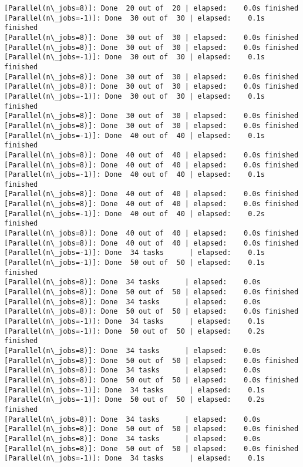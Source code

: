 \documentclass[11pt]{article}
\begin{document}
\begin{Verbatim}[commandchars=\\\{\}]
[Parallel(n\_jobs=8)]: Done  20 out of  20 | elapsed:    0.0s finished
[Parallel(n\_jobs=-1)]: Done  30 out of  30 | elapsed:    0.1s finished
[Parallel(n\_jobs=8)]: Done  30 out of  30 | elapsed:    0.0s finished
[Parallel(n\_jobs=8)]: Done  30 out of  30 | elapsed:    0.0s finished
[Parallel(n\_jobs=-1)]: Done  30 out of  30 | elapsed:    0.1s finished
[Parallel(n\_jobs=8)]: Done  30 out of  30 | elapsed:    0.0s finished
[Parallel(n\_jobs=8)]: Done  30 out of  30 | elapsed:    0.0s finished
[Parallel(n\_jobs=-1)]: Done  30 out of  30 | elapsed:    0.1s finished
[Parallel(n\_jobs=8)]: Done  30 out of  30 | elapsed:    0.0s finished
[Parallel(n\_jobs=8)]: Done  30 out of  30 | elapsed:    0.0s finished
[Parallel(n\_jobs=-1)]: Done  40 out of  40 | elapsed:    0.1s finished
[Parallel(n\_jobs=8)]: Done  40 out of  40 | elapsed:    0.0s finished
[Parallel(n\_jobs=8)]: Done  40 out of  40 | elapsed:    0.0s finished
[Parallel(n\_jobs=-1)]: Done  40 out of  40 | elapsed:    0.1s finished
[Parallel(n\_jobs=8)]: Done  40 out of  40 | elapsed:    0.0s finished
[Parallel(n\_jobs=8)]: Done  40 out of  40 | elapsed:    0.0s finished
[Parallel(n\_jobs=-1)]: Done  40 out of  40 | elapsed:    0.2s finished
[Parallel(n\_jobs=8)]: Done  40 out of  40 | elapsed:    0.0s finished
[Parallel(n\_jobs=8)]: Done  40 out of  40 | elapsed:    0.0s finished
[Parallel(n\_jobs=-1)]: Done  34 tasks      | elapsed:    0.1s
[Parallel(n\_jobs=-1)]: Done  50 out of  50 | elapsed:    0.1s finished
[Parallel(n\_jobs=8)]: Done  34 tasks      | elapsed:    0.0s
[Parallel(n\_jobs=8)]: Done  50 out of  50 | elapsed:    0.0s finished
[Parallel(n\_jobs=8)]: Done  34 tasks      | elapsed:    0.0s
[Parallel(n\_jobs=8)]: Done  50 out of  50 | elapsed:    0.0s finished
[Parallel(n\_jobs=-1)]: Done  34 tasks      | elapsed:    0.1s
[Parallel(n\_jobs=-1)]: Done  50 out of  50 | elapsed:    0.2s finished
[Parallel(n\_jobs=8)]: Done  34 tasks      | elapsed:    0.0s
[Parallel(n\_jobs=8)]: Done  50 out of  50 | elapsed:    0.0s finished
[Parallel(n\_jobs=8)]: Done  34 tasks      | elapsed:    0.0s
[Parallel(n\_jobs=8)]: Done  50 out of  50 | elapsed:    0.0s finished
[Parallel(n\_jobs=-1)]: Done  34 tasks      | elapsed:    0.1s
[Parallel(n\_jobs=-1)]: Done  50 out of  50 | elapsed:    0.2s finished
[Parallel(n\_jobs=8)]: Done  34 tasks      | elapsed:    0.0s
[Parallel(n\_jobs=8)]: Done  50 out of  50 | elapsed:    0.0s finished
[Parallel(n\_jobs=8)]: Done  34 tasks      | elapsed:    0.0s
[Parallel(n\_jobs=8)]: Done  50 out of  50 | elapsed:    0.0s finished
[Parallel(n\_jobs=-1)]: Done  34 tasks      | elapsed:    0.1s

\end{Verbatim}
\end{document}
